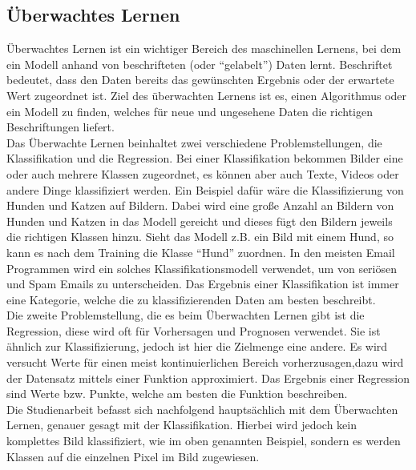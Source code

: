 \subsection{Überwachtes Lernen}
\label{sec:ÜberwachtesLernen}
Überwachtes Lernen ist ein wichtiger Bereich des maschinellen Lernens, bei dem ein \gls{Modell} anhand von beschrifteten (oder ``gelabelt'') Daten lernt. Beschriftet bedeutet, dass den Daten bereits das gewünschten Ergebnis oder der erwartete Wert zugeordnet ist. Ziel des überwachten Lernens ist es, einen \gls{Algorithmus} oder ein \gls{Modell} zu finden, welches für neue und ungesehene Daten die richtigen Beschriftungen liefert.\cite[vgl.][]{Frochte2020,IBMSupervisedLearning} \\
Das Überwachte Lernen beinhaltet zwei verschiedene Problemstellungen, die Klassifikation und die Regression. Bei einer Klassifikation bekommen Bilder eine oder auch mehrere Klassen zugeordnet, es können aber auch Texte, Videos oder andere Dinge klassifiziert werden. Ein Beispiel dafür wäre die Klassifizierung von Hunden und Katzen auf Bildern. Dabei wird eine große Anzahl an Bildern von Hunden und Katzen in das \gls{Modell} gereicht und dieses fügt den Bildern jeweils die richtigen Klassen hinzu. Sieht das \gls{Modell} z.B. ein Bild mit einem Hund, so kann es nach dem Training die Klasse ``Hund'' zuordnen. In den meisten Email Programmen wird ein solches Klassifikationsmodell verwendet, um von seriösen und Spam Emails zu unterscheiden. Das Ergebnis einer Klassifikation ist immer eine Kategorie, welche die zu klassifizierenden Daten am besten beschreibt. \\
Die zweite Problemstellung, die es beim Überwachten Lernen gibt ist die Regression, diese wird oft für Vorhersagen und Prognosen verwendet.  Sie ist ähnlich zur Klassifizierung, jedoch ist hier die Zielmenge eine andere. Es wird versucht Werte für einen meist kontinuierlichen Bereich vorherzusagen,dazu wird der Datensatz mittels einer Funktion approximiert. Das Ergebnis einer Regression sind Werte bzw. Punkte, welche am besten die Funktion beschreiben.\cite[vgl.][]{Frochte2020} \\
Die Studienarbeit befasst sich nachfolgend hauptsächlich mit dem Überwachten Lernen, genauer gesagt mit der Klassifikation. Hierbei wird jedoch kein komplettes Bild klassifiziert, wie im oben genannten Beispiel, sondern es werden Klassen auf die einzelnen Pixel im Bild zugewiesen.

